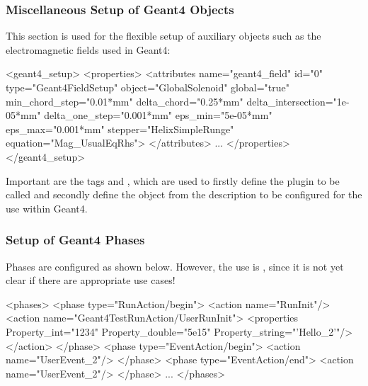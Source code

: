 \documentclass[10pt,a4paper]{article}
\begin{document}
\subsubsection{Miscellaneous Setup of Geant4 Objects}
\label{sec:ddg4-setup-xml-geant4-objects}

\noindent
This section is used for the flexible setup of auxiliary objects such as the 
electromagnetic fields used in Geant4:
\begin{code}
  <geant4_setup>
    <properties>
      <attributes name="geant4_field"
            id="0"
            type="Geant4FieldSetup"
            object="GlobalSolenoid"
            global="true"
            min_chord_step="0.01*mm"
            delta_chord="0.25*mm"
            delta_intersection="1e-05*mm"
            delta_one_step="0.001*mm"
            eps_min="5e-05*mm"
            eps_max="0.001*mm"
            stepper="HelixSimpleRunge"
            equation="Mag_UsualEqRhs">
      </attributes>
      ...
    </properties>
  </geant4_setup>
\end{code}
Important are the tags  and , which are used to firstly
define the plugin to be called and secondly define the object from the \DDhep
description to be configured for the use within Geant4.

\subsubsection{Setup of Geant4 Phases}
\label{sec:ddg4-setup-xml-geant4-phases}

\noindent
Phases are configured as shown below.
However, the use is ,
since it is not yet clear if there are appropriate use cases!
\begin{code}
  <phases>
    <phase type="RunAction/begin">
      <action name="RunInit"/>
      <action name="Geant4TestRunAction/UserRunInit">
    <properties Property_int="1234"
            Property_double="5e15"
            Property_string="'Hello_2'"/>
      </action>
    </phase>
    <phase type="EventAction/begin">
      <action name="UserEvent_2"/>
    </phase>
    <phase type="EventAction/end">
      <action name="UserEvent_2"/>
    </phase>
    ...
  </phases>
\end{code}
\end{document}
